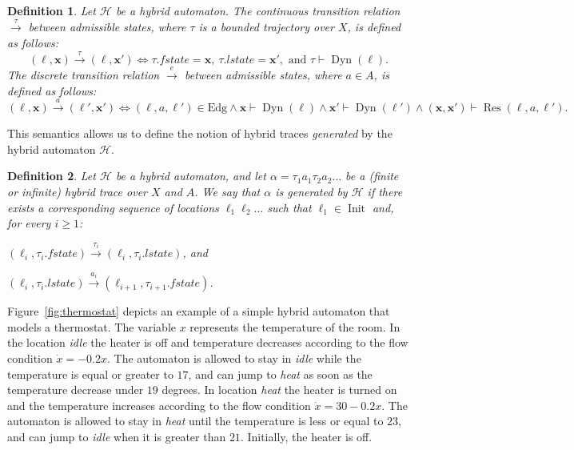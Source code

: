 \documentclass[submission,copyright,creativecommons]{eptcs}
\newcommand{\cmodels}{\vdash}
\newtheorem{definition}{Definition}
\newcommand{\autH}{\mathcal{H}}
\newcommand{\Edg}{\mathrm{Edg}}
\DeclareMathOperator{\Dyn}{{Dyn}}
\DeclareMathOperator{\Res}{{Res}}
\DeclareMathOperator{\Init}{{Init}}
\newcommand{\fstate}{\mathit{fstate}}
\newcommand{\lstate}{\mathit{lstate}}
\newcommand{\bx}{\mathbf{x}}
\newcommand{\trans}[1]{\xrightarrow{#1}}
\begin{document}
\begin{definition}\label{def:ha-semantics}
Let $\autH$ be a hybrid automaton.
The \emph{continuous transition relation} $\trans{\tau}$ between admissible states, 
where $\tau$ is a bounded trajectory over $X$, is
defined as follows:
\begin{equation}\label{eq:cont-trans}
(\ell,\bx) \trans{\tau} (\ell,\bx')  \iff \tau.\fstate=\bx,\ \tau.\lstate=\bx', \text{ and } \tau \cmodels \Dyn(\ell).
\end{equation}
The \emph{discrete transition relation} $\trans{e}$ between admissible states, where
$a \in A$, is defined as follows:
\begin{equation}\label{eq:disc-trans}
(\ell,\bx) \trans{a} (\ell',\bx') \iff (\ell,a,\ell') \in \Edg \wedge \bx \cmodels \Dyn(\ell) \wedge \bx' \cmodels \Dyn(\ell') \wedge (\bx,\bx') \cmodels \Res(\ell,a,\ell').
\end{equation}
\end{definition}

This semantics allows us to define the notion of hybrid traces \emph{generated} by the hybrid automaton $\autH$.

\begin{definition}\label{def:ha-trace}
Let $\autH$ be a hybrid automaton, and let $\alpha = \tau_1 a_1 \tau_2 a_2 \ldots$ be a (finite or infinite) hybrid trace over $X$ and $A$. We say that $\alpha$ is \emph{generated} by $\autH$ if there exists a corresponding sequence of locations $\ell_1 \ell_2 \ldots$ such that $\ell_1 \in \Init$ and, for every $i \geq 1$:
\begin{inparaenum}[(i)]
\item  $(\ell_i,\tau_i.\fstate) \trans{\tau_i} (\ell_i,\tau_i.\lstate)$, and
\item $(\ell_i,\tau_i.\lstate) \trans{a_i} (\ell_{i+1},\tau_{i+1}.\fstate)$.
\end{inparaenum}
\end{definition}

Figure~\ref{fig:thermostat} depicts an example of a simple hybrid automaton that models a thermostat. The variable $x$ represents the temperature of the room. In the location \emph{idle} the heater is off and temperature decreases according to the flow condition $\dot{x} = -0.2 x$. The automaton is allowed to stay in \emph{idle}  while the temperature is equal or greater to $17$, and can jump to \emph{heat} as soon as the temperature decrease under $19$ degrees. In location \emph{heat} the heater is turned on and the temperature increases according to the flow condition  $\dot{x} = 30 - 0.2x$. The automaton is allowed to stay in \emph{heat} until the temperature is less or equal to $23$, and can jump to \emph{idle} when it is greater than $21$. Initially, the heater is off.
\end{document}
